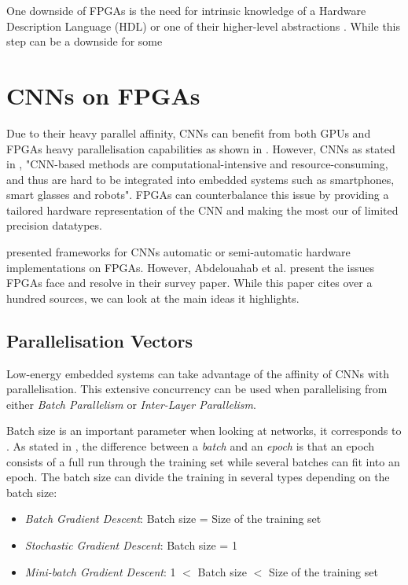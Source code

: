 One downside of FPGAs is the need for intrinsic knowledge of a Hardware Description Language (HDL) or one of their higher-level abstractions \cite{XuanSang2014}. While this step can be a downside for some


\section{CNNs on FPGAs}

Due to their heavy parallel affinity, CNNs can benefit from both GPUs and FPGAs heavy parallelisation capabilities as shown in \cite{}. However, CNNs as stated in \cite{Jahanshahi2019}, "CNN-based methods are computational-intensive and resource-consuming, and thus are hard to be integrated into embedded systems such as smartphones, smart glasses and robots". FPGAs can counterbalance this issue by providing a tailored hardware representation of the CNN and making the most our of limited precision datatypes.

\cite{} presented frameworks for CNNs automatic or semi-automatic hardware implementations on FPGAs. However, Abdelouahab et al. \cite{Abdelouahab2018} present the issues FPGAs face and resolve in their survey paper. While this paper cites over a hundred sources, we can look at the main ideas it highlights.

\subsection{Parallelisation Vectors}

Low-energy embedded systems can take advantage of the affinity of CNNs with parallelisation. This extensive concurrency can be used when parallelising from either \emph{Batch Parallelism} or \emph{Inter-Layer Parallelism}.

Batch size is an important parameter when looking at networks, it corresponds to  \cite{MLMastery2019}. As stated in \cite{MLMastery2019}, the difference between a \emph{batch} and an \emph{epoch} is that an epoch consists of a full run through the training set while several batches can fit into an epoch. The batch size can divide the training in several types depending on the batch size:

\begin{itemize}
	\item \emph{Batch Gradient Descent}: Batch size = Size of the training set
	\item \emph{Stochastic Gradient Descent}: Batch size = 1
	\item \emph{Mini-batch Gradient Descent}: 1 $<$ Batch size $<$ Size of the training set
\end{itemize}

